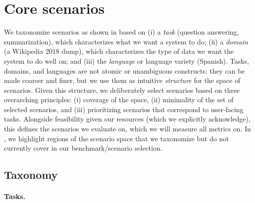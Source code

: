 \hypertarget{core-scenarios}{\section{Core scenarios}}
\label{sec:core-scenarios}

We taxonomize scenarios as shown in  based on 
(i) a \emph{task} (\eg question answering, summarization), which characterizes what we want a system to do; 
(ii) a \emph{domain} (\eg a Wikipedia 2018 dump), which characterizes the type of data we want the system to do well on;
and
(iii) the \textit{language} or language variety (\eg Spanish).
Tasks, domains, and languages are not atomic or unambiguous constructs: they can be made coarser and finer, but we use them as intuitive \textit{structure} for the space of scenarios.
Given this structure, we deliberately select scenarios based on three overarching principles:
(i) coverage of the space,
(ii) minimality of the set of selected scenarios,
and (iii) prioritizing scenarios that correspond to user-facing tasks.
Alongside feasibility given our resources (which we explicitly acknowledge), this defines the \core scenarios we evaluate on, which we will measure all metrics on. 
In , we highlight regions of the scenario space that we taxonomize but do not currently cover in our benchmark/scenario selection.

\hypertarget{scenario-taxonomy}{\subsection{Taxonomy}}
\label{sec:generic-scenarios-taxonomy}


\paragraph{Tasks.}

